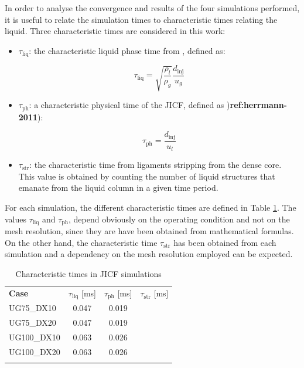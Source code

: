 In order to analyse the convergence and results of the four simulations performed, it is useful to relate the simulation times to characteristic times relating the liquid. Three characteristic times are considered in this work:

\begin{itemize}
	
	\item $\tau_\mathrm{liq}$: the characteristic liquid phase time from , defined as:
	
	\begin{equation}
	\tau_\mathrm{liq} = \sqrt{\frac{\rho_l}{\rho_g}} \frac{d_\mathrm{inj}}{u_g}
	\end{equation}
	
	\item $\tau_\mathrm{ph}$: a characteristic physical time of the JICF, defined as )\textbf{ref:herrmann-2011}):
	
	\begin{equation}
	\label{eq:jicf_tau_injector}
	\tau_\mathrm{ph} = \frac{d_\mathrm{inj}}{u_l}
	\end{equation}

	\item $\tau_\mathrm{str}$: the characteristic time from ligaments stripping from the dense core. This value is obtained by counting the number of liquid structures that emanate from the liquid column in a given time period.

\end{itemize}



For each simulation, the different characteristic times are defined in Table \ref{tab:jicf_characteristic times}. The values $\tau_\mathrm{liq}$ and $\tau_\mathrm{ph}$, depend obviously on the operating condition and not on the mesh resolution, since they are have been obtained from mathematical formulas. On the other hand, the characteristic time $\tau_\mathrm{str}$ has been obtained from each simulation and a dependency on the mesh resolution employed can be expected. 

\begin{table}[!h]
\centering
\caption{Characteristic times in JICF simulations}
\begin{tabular}{lccc}
\thickhline
\textbf{Case} & $\tau_\mathrm{liq}$ [ms] & $\tau_\mathrm{ph}$ [ms] & $\tau_\mathrm{str}$ [ms] \\
\thickhline 
UG75\_DX10  & 0.047 & 0.019 & \\
UG75\_DX20  & 0.047 & 0.019 & \\
UG100\_DX10 & 0.063 & 0.026 & \\
UG100\_DX20 & 0.063 & 0.026 & \\
\thickhline
\end{tabular}
\label{tab:jicf_characteristic times}
\end{table}

